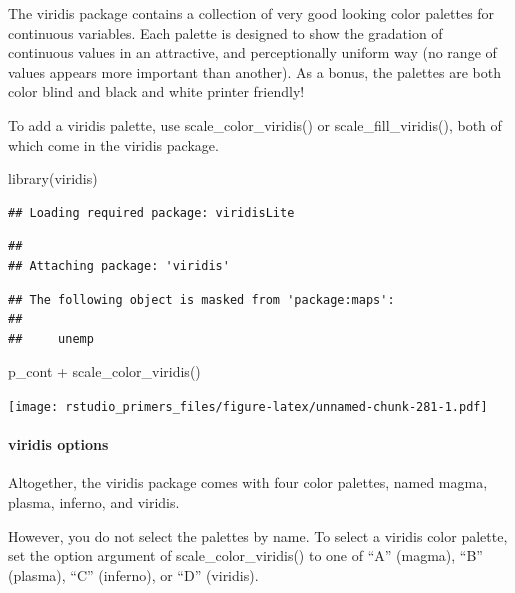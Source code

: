 \documentclass[
]{article}
\newenvironment{Shaded}{\begin{snugshade}}{\end{snugshade}}
\newcommand{\FunctionTok}[1]{\textcolor[rgb]{0.00,0.00,0.00}{#1}}
\newcommand{\NormalTok}[1]{#1}
\newcommand{\SpecialCharTok}[1]{\textcolor[rgb]{0.00,0.00,0.00}{#1}}
\begin{document}
The viridis package contains a collection of very good looking color
palettes for continuous variables. Each palette is designed to show the
gradation of continuous values in an attractive, and perceptionally
uniform way (no range of values appears more important than another). As
a bonus, the palettes are both color blind and black and white printer
friendly!

To add a viridis palette, use scale\_color\_viridis() or
scale\_fill\_viridis(), both of which come in the viridis package.

\begin{Shaded}
\begin{Highlighting}[]
\FunctionTok{library}\NormalTok{(viridis)}
\end{Highlighting}
\end{Shaded}

\begin{verbatim}
## Loading required package: viridisLite
\end{verbatim}

\begin{verbatim}
## 
## Attaching package: 'viridis'
\end{verbatim}

\begin{verbatim}
## The following object is masked from 'package:maps':
## 
##     unemp
\end{verbatim}

\begin{Shaded}
\begin{Highlighting}[]
\NormalTok{p\_cont }\SpecialCharTok{+} \FunctionTok{scale\_color\_viridis}\NormalTok{()}
\end{Highlighting}
\end{Shaded}

\texttt{[image: rstudio\_primers\_files/figure-latex/unnamed-chunk-281-1.pdf]}

\hypertarget{viridis-options}{%
\paragraph{viridis options}\label{viridis-options}}

Altogether, the viridis package comes with four color palettes, named
magma, plasma, inferno, and viridis.

However, you do not select the palettes by name. To select a viridis
color palette, set the option argument of scale\_color\_viridis() to one
of ``A'' (magma), ``B'' (plasma), ``C'' (inferno), or ``D'' (viridis).
\end{document}
